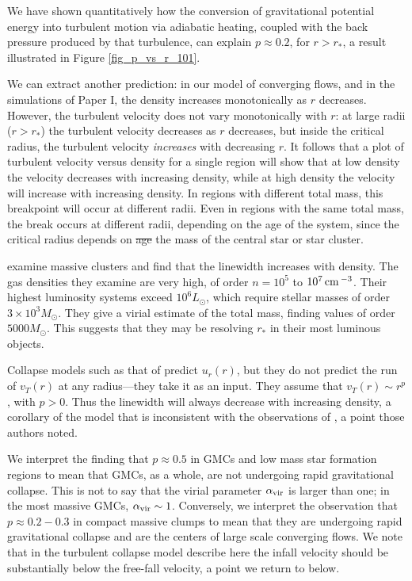\documentclass[iop,apj,numberedappendix]{emulateapj}
\newcommand       \phil[1]      {{\color{blue} #1}}
\newcommand       \cm		{\,{\rm cm \,}}
\begin{document}
We have shown quantitatively how the
conversion of gravitational potential energy into turbulent motion via
adiabatic heating, coupled with the back pressure produced by that
turbulence, can explain $p\approx0.2$, for $r>r_*$, a result
illustrated in Figure \ref{fig_p_vs_r_101}.

We can extract another prediction: in our model of converging flows,
and in the simulations of \phil{Paper I}, the density
increases monotonically as $r$ decreases. However, the turbulent
velocity does not vary monotonically with $r$: at large radii
($r>r_*$) the turbulent velocity decreases as $r$ decreases, but
inside the critical radius, the turbulent velocity {\em increases}
with decreasing $r$. It follows that a plot of turbulent velocity
versus density for a single region will show that at low density the
velocity decreases with increasing density, while at high density the
velocity will increase with increasing density. In regions with
different total mass, this breakpoint will occur at different
radii. Even in regions with the same total mass, the break occurs at
different radii, depending on the age of the system, since the
critical radius depends on \phil{\sout{age} the mass of the central star or star cluster}.

\citet{1997ApJ...476..730P} examine massive clusters and find that the
linewidth increases with density. The gas densities they examine are
very high, of order $n=10^5$ to $10^7\cm^{-3}$. Their highest
luminosity systems exceed $10^6L_\odot$, which require stellar masses
of order $3\times10^3M_\odot$. They give a virial estimate of the
total mass, finding values of order $5000M_\odot$. This suggests that
they may be resolving $r_*$ in their most luminous objects.

Collapse models such as that of
\cite{1997ApJ...476..750M,2003ApJ...585..850M,2004ApJ...615..813F}
predict $u_r(r)$,
but they do not predict the run of $v_T(r)$ at any radius---they take
it as an input. They assume that $v_T(r)\sim r^p$, with $p>0$. Thus
the linewidth will always decrease with increasing density, a
corollary of the model that is inconsistent with the observations of
\citet{1997ApJ...476..730P}, a point those authors noted.

We interpret the finding that $p\approx0.5$ in GMCs and low mass star
formation regions to mean that GMCs, as a whole, are not undergoing
rapid gravitational collapse. This is not to say that the
virial parameter $\alpha_{\rm vir}$ is larger than one; in the most massive
GMCs, $\alpha_{\rm vir}\sim1$. Conversely, we interpret the
observation that $p\approx0.2-0.3$ in compact massive clumps to mean
that they are undergoing rapid gravitational collapse \phil{and are the centers of large scale converging flows}. We note that in
the turbulent collapse model describe here the
infall velocity should be substantially below the free-fall velocity,
a point we return to below.
\end{document}
